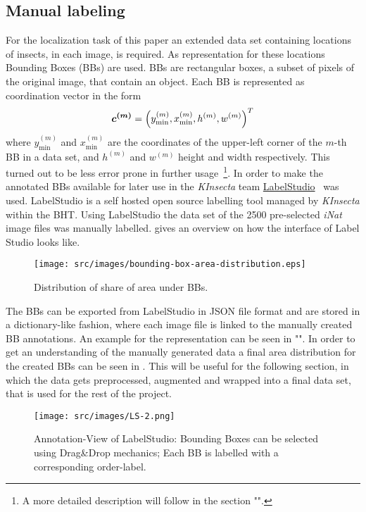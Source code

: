 \subsection{Manual labeling}\label{subsec:manual-labeling}
For the localization task of this paper an extended data set containing locations of insects, in each image, is required.
As representation for these locations Bounding Boxes (BBs) are used.
BBs are rectangular boxes, a subset of pixels of the original image, that contain an object.
Each BB is represented as coordination vector in the form
\begin{align}
    \bm{c^{(m)}} =
    \left(
        y^{(m)}_{\min},
        x^{(m)}_{\min},
        h^{(m)},
        w^{(m)}
    \right)^T
    \label{eq:bb}
\end{align}
where $y^{(m)}_{\min}$ and $x^{(m)}_{\min}$ are the coordinates of the upper-left corner of the $m$-th BB in a data set, and $h^{(m)}$ and $w^{(m)}$ height and width respectively.
This turned out to be less error prone in further usage~\footnote{
    A more detailed description will follow in the section "".
}.
In order to make the annotated BBs available for later use in the \textit{KInsecta} team \href{https://labelstud.io/}{LabelStudio}~\cite{Label-Studio} was used.
LabelStudio is a self hosted open source labelling tool managed by \textit{KInsecta} within the BHT.
Using LabelStudio the data set of the 2500 pre-selected \textit{iNat} image files was manually labelled.
 gives an overview on how the interface of Label Studio looks like.
\begin{wrapfigure}{l}{.45\linewidth}
    \centering
    \texttt{[image: src/images/bounding-box-area-distribution.eps]}
    \caption{Distribution of share of area under BBs.}
    \label{fig:bb-area-distribution}
\end{wrapfigure}
The BBs can be exported from LabelStudio in JSON file format and are stored in a dictionary-like fashion, where each image file is linked to the manually created BB annotations.
An example for the representation can be seen in "".
In order to get an understanding of the manually generated data a final area distribution for the created BBs can be seen in .
This will be useful for the following section, in which the data gets preprocessed, augmented and wrapped into a final data set, that is used for the rest of the project.

\vfill
\begin{figure}[!ht]
    \centering
    \texttt{[image: src/images/LS-2.png]}
    \caption{Annotation-View of LabelStudio: Bounding Boxes can be selected using Drag\&Drop mechanics; Each BB is labelled with a corresponding order-label.}
    \label{fig:label-studio-1}
\end{figure}
